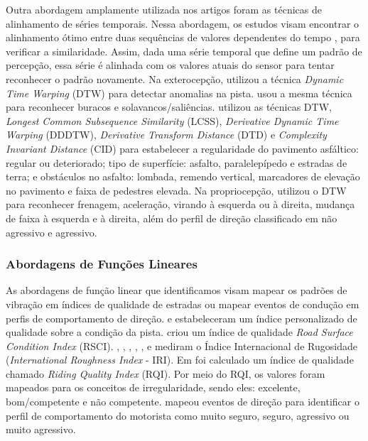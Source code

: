 Outra abordagem amplamente utilizada nos artigos foram as técnicas de alinhamento de séries temporais. Nessa abordagem, os estudos visam encontrar o alinhamento ótimo entre duas sequências de valores dependentes do tempo \cite{Muller2007}, para verificar a similaridade. Assim, dada uma série temporal que define um padrão de percepção, essa série é alinhada com os valores atuais do sensor para tentar reconhecer o padrão novamente. Na exterocepção, \cite{Alqudah2016} utilizou a técnica \textit{Dynamic Time Warping} (DTW) para detectar anomalias na pista. \cite{Singh2017} usou a mesma técnica para reconhecer buracos e solavancos/saliências. \cite{Souza2018} utilizou as técnicas DTW, \textit{Longest Common Subsequence Similarity} (LCSS), \textit{Derivative Dynamic Time Warping} (DDDTW), \textit{Derivative Transform Distance} (DTD) e \textit{Complexity Invariant Distance} (CID) para estabelecer a regularidade do pavimento asfáltico: regular ou deteriorado; tipo de superfície: asfalto, paralelepípedo e estradas de terra; e obstáculos no asfalto: lombada, remendo vertical, marcadores de elevação no pavimento e faixa de pedestres elevada. Na propriocepção, \cite{Pholprasit2015} utilizou o DTW para reconhecer frenagem, aceleração, virando à esquerda ou à direita, mudança de faixa à esquerda e à direita, além do perfil de direção classificado em não agressivo e agressivo.

\subsubsection{Abordagens de Funções Lineares}

As abordagens de função linear que identificamos visam mapear os padrões de vibração em índices de qualidade de estradas ou mapear eventos de condução em perfis de comportamento de direção. \cite{Prapulla2017} e \cite{BelloSalau2018} estabeleceram um índice personalizado de qualidade sobre a condição da pista. \cite{Brunauer2016} criou um índice de qualidade \textit{Road Surface Condition Index} (RSCI). \cite{Chen2013}, \cite{Douangphachanh2013}, \cite{Douangphachanh2014}, \cite{Li2018}, \cite{Pitonak2016}, \cite{Singh2017} e \cite{Tomiyama2016} mediram o Índice Internacional de Rugosidade (\textit{International Roughness Index} - IRI). Em \cite{Chen2013} foi calculado um índice de qualidade chamado \textit{Riding Quality Index} (RQI). Por meio do RQI, os valores foram mapeados para os conceitos de irregularidade, sendo eles: excelente, bom/competente e não competente. \cite{Saiprasert2014} mapeou eventos de direção para identificar o perfil de comportamento do motorista como muito seguro, seguro, agressivo ou muito agressivo.

